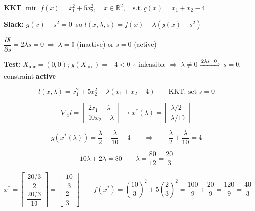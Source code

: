 \documentclass[10pt,a3paper]{article}
\begin{document}
\noindent
\begin{minipage}[t]{0.50\linewidth}

\noindent\textbf{KKT} \quad $\min\ f(x) = x_1^2 + 5x_2^2,\quad x \in \mathbb{R}^2,\quad \text{s.t.}\ g(x) = x_1 + x_2 - 4$

\noindent\textbf{Slack:} $g(x) - s^2 = 0$, so $l(x,\lambda,s) = f(x) - \lambda(g(x) - s^2)$

\noindent$\dfrac{\partial l}{\partial s} = 2\lambda s = 0 \;\Rightarrow\; \lambda = 0$ (inactive) or $s = 0$ (active)

\noindent\textbf{Test:} $X_\text{unc} = (0,0)$;\; $g(X_\text{unc}) = -4 < 0$ \quad $\therefore$ infeasible $\Rightarrow$ $\lambda \neq 0$ \quad $\xRightarrow{2\lambda s=0}$ \quad $s = 0$, constraint \textbf{active}

\[
  l(x,\lambda) = x_1^2 + 5x_2^2 - \lambda(x_1 + x_2 - 4) \qquad \text{KKT: set } s=0
\]

\[
  \nabla_x l = \begin{bmatrix} 2x_1 - \lambda \\ 10x_2 - \lambda \end{bmatrix}
  \rightarrow
  x^*(\lambda) = \begin{bmatrix} \lambda/2 \\ \lambda/10 \end{bmatrix}
\]

\[
  g\!\left(x^*(\lambda)\right) = \frac{\lambda}{2} + \frac{\lambda}{10} - 4
  \qquad\Rightarrow\qquad
  \frac{\lambda}{2} + \frac{\lambda}{10} = 4
\]

\[
  10\lambda + 2\lambda = 80 \qquad \lambda = \frac{80}{12} = \frac{20}{3}
\]

\[
  x^* = \begin{bmatrix} \dfrac{20/3}{2} \\[4pt] \dfrac{20/3}{10} \end{bmatrix}
       = \begin{bmatrix} \dfrac{10}{3} \\[4pt] \dfrac{2}{3} \end{bmatrix}
  \qquad
  f(x^*) = \left(\frac{10}{3}\right)^2 + 5\left(\frac{2}{3}\right)^2
          = \frac{100}{9} + \frac{20}{9}
          = \frac{120}{9}
          = \frac{40}{3}
\]

\end{minipage}\hfill
\end{document}
